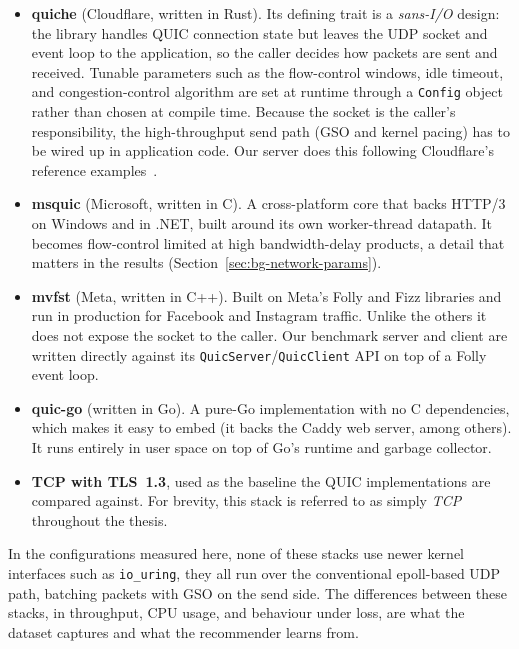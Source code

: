 \begin{itemize}
  \item \textbf{quiche} (Cloudflare, written in Rust). Its defining trait is a
        \emph{sans-I/O} design: the library handles QUIC connection state but
        leaves the UDP socket and event loop to the application, so the caller
        decides how packets are sent and received. Tunable parameters such as
        the flow-control windows, idle timeout, and congestion-control
        algorithm are set at runtime through a \texttt{Config} object rather
        than chosen at compile time. Because the socket is the caller's
        responsibility, the high-throughput send path (GSO and kernel pacing)
        has to be wired up in application code. Our server does this following
        Cloudflare's reference examples~\cite{cloudflare-quiche-gso}.
  \item \textbf{msquic} (Microsoft, written in C). A cross-platform core that
        backs HTTP/3 on Windows and in .NET, built around its own worker-thread
        datapath. It becomes flow-control limited at high bandwidth-delay
        products, a detail that matters in the results
        (Section~\ref{sec:bg-network-params}).
  \item \textbf{mvfst} (Meta, written in C++). Built on Meta's Folly and Fizz
        libraries and run in production for Facebook and Instagram traffic.
        Unlike the others it does not expose the socket to the caller. Our
        benchmark server and client are written directly against its
        \texttt{QuicServer}/\texttt{QuicClient} API on top of a Folly event loop.
  \item \textbf{quic-go} (written in Go). A pure-Go implementation with no C
        dependencies, which makes it easy to embed (it backs the Caddy web
        server, among others). It runs entirely in user space on top of Go's
        runtime and garbage collector.
  \item \textbf{TCP with TLS~1.3}, used as the baseline the QUIC
        implementations are compared against. For brevity, this stack is
        referred to as simply \emph{TCP} throughout the thesis.
\end{itemize}

In the configurations measured here, none of these stacks use newer kernel
interfaces such as \texttt{io\_uring}, they all run over the conventional
epoll-based UDP path, batching packets with GSO on the send side. The differences between these stacks, in throughput, CPU usage, and
behaviour under loss, are what the dataset captures and what the recommender
learns from.

